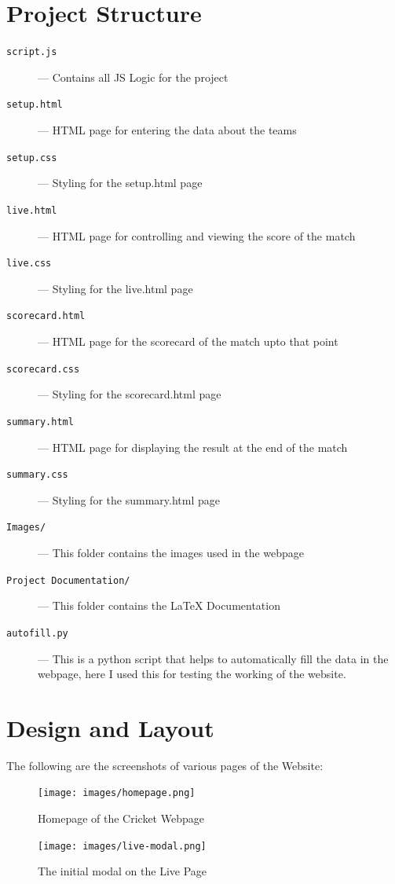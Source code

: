 \documentclass[a4paper,12pt]{article}
\begin{document}
\section{Project Structure}
\vspace{0.5cm}
\begin{description}
\item [\texttt{script.js}] --- Contains all JS Logic for the project
\item [\texttt{setup.html}] --- HTML page for entering the data about the teams
\item [\texttt{setup.css}] --- Styling for the setup.html page
\item [\texttt{live.html}] --- HTML page for controlling and viewing the score of the match
\item [\texttt{live.css}] --- Styling for the live.html page
\item [\texttt{scorecard.html}] --- HTML page for the scorecard of the match upto that point
\item [\texttt{scorecard.css}] --- Styling for the scorecard.html page 
\item [\texttt{summary.html}] --- HTML page for displaying the result at the end of the match 
\item [\texttt{summary.css}] --- Styling for the summary.html page
\item [\texttt{Images/}] --- This folder contains the images used in the webpage
\item [\texttt{Project Documentation/}] --- This folder contains the \LaTeX \hspace*{0.025cm} Documentation
\item [\texttt{autofill.py}] --- This is a python script that helps to automatically fill the data in the \hspace*{2cm} webpage, here I used this for testing the working of the website.
\end{description}
\clearpage

\section{Design and Layout}
The following are the screenshots of various pages of the Website:
\begin{figure}[h!]
\centering
\texttt{[image: images/homepage.png]}
\caption{Homepage of the Cricket Webpage}
\label{homepage}
\end{figure}

\begin{figure}[h!]
\centering
\texttt{[image: images/live-modal.png]}
\caption{The initial modal on the Live Page}
\label{live-modal}
\end{figure}
\clearpage
\end{document}
